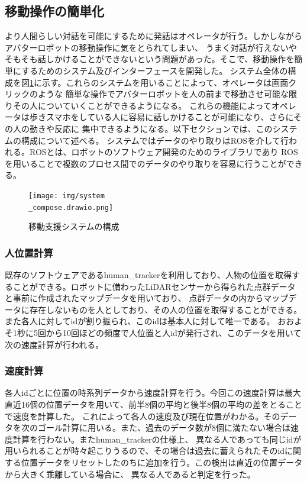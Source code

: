 \documentclass{kuisthesis}
\begin{document}
\subsection{移動操作の簡単化}
より人間らしい対話を可能にするために発話はオペレータが行う。しかしながらアバターロボットの移動操作に気をとられてしまい、
うまく対話が行えないやそもそも話しかけることができないという問題があった。そこで、移動操作を簡単にするためのシステム及びインターフェースを開発した。
システム全体の構成を図\ref{pic:systemcompose}に示す。これらのシステムを用いることによって、オペレータは画面クリックのような
簡単な操作でアバターロボットを人の前まで移動させ可能な限りその人についていくことができるようになる。
これらの機能によってオペレータは歩きスマホをしている人に容易に話しかけることが可能になり、さらにその人の動きや反応に
集中できるようになる。以下セクションでは、このシステムの構成について述べる。
システムではデータのやり取りはROSを介して行われる。ROSとは、ロボットのソフトウェア開発のためのライブラリであり
ROSを用いることで複数のプロセス間でのデータのやり取りを容易に行うことができる。
\begin{figure}[h]
  
  \texttt{[image: img/system\\\_compose.drawio.png]}
  \caption{移動支援システムの構成}
  \label{pic:systemcompose}

\end{figure}


\subsubsection{人位置計算}
既存のソフトウェアであるhuman\_trackerを利用しており、人物の位置を取得することができる。ロボットに備わったLiDARセンサーから得られた点群データと事前に作成されたマップデータを用いており、
点群データの内からマップデータに存在しないものを人としており、その人の位置を取得することができる。また各人に対してidが割り振られ、このidは基本人に対して唯一である。
おおよそ1秒に5回から10回ほどの頻度で人位置と人idが発行され、このデータを用いて次の速度計算が行われる。

\subsubsection{速度計算}
各人idごとに位置の時系列データから速度計算を行う。今回この速度計算は最大直近16個の位置データを用いて、前半8個の平均と後半8個の平均の差をとることで速度を計算した。
これによって各人の速度及び現在位置がわかる。そのデータを次のゴール計算に用いる。また、過去のデータ数が8個に満たない場合は速度計算を行わない。またhuman\_trackerの仕様上、
異なる人であっても同じidが用いられることが時々起こりうるので、その場合は過去に蓄えられたそのidに関する位置データをリセットしたのちに追加を行う。この検出は直近の位置データから大きく乖離している場合に、
異なる人であると判定を行った。
\end{document}
